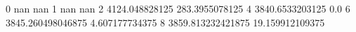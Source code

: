0 nan nan
1 nan nan
2 4124.048828125 283.3955078125
4 3840.6533203125 0.0
6 3845.260498046875 4.607177734375
8 3859.813232421875 19.159912109375
